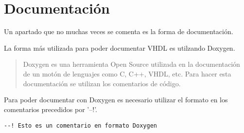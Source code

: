 \section{Documentación}


Un apartado que no muchas veces se comenta es la forma de documentación.

La forma más utilizada para poder documentar VHDL es utilzando Doxygen.

\begin{quote}
    Doxygen es una herramienta Open Source utilizada en la documentación de 
    un motón de lenguajes como C, C++, VHDL, etc.
    Para hacer esta documentación se utilizan los comentarios de código.
\end{quote}

Para poder documentar con Doxygen es necesario utilizar el formato en los comentarios
precedidos por '--!'.

\begin{verbatim}
--! Esto es un comentario en formato Doxygen
\end{verbatim}
